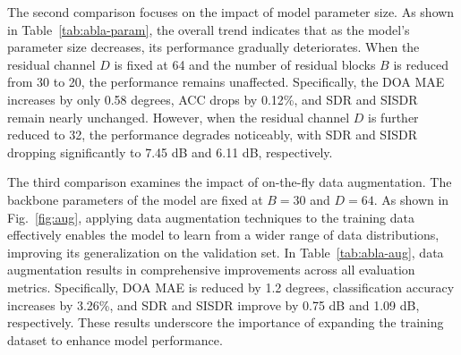 \documentclass{IEEEtran}
\begin{document}
The second comparison focuses on the impact of model parameter size. As shown in Table~\ref{tab:abla-param}, the overall trend indicates that as the model's parameter size decreases, its performance gradually deteriorates. When the residual channel $D$ is fixed at 64 and the number of residual blocks $B$ is reduced from 30 to 20, the performance remains unaffected. Specifically, the DOA MAE increases by only 0.58 degrees, ACC drops by 0.12\%, and SDR and SISDR remain nearly unchanged. However, when the residual channel $D$ is further reduced to 32, the performance degrades noticeably, with SDR and SISDR dropping significantly to 7.45 dB and 6.11 dB, respectively.

The third comparison examines the impact of on-the-fly data augmentation. The backbone parameters of the model are fixed at $B=30$ and $D=64$. As shown in Fig.~\ref{fig:aug}, applying data augmentation techniques to the training data effectively enables the model to learn from a wider range of data distributions, improving its generalization on the validation set. In Table~\ref{tab:abla-aug}, data augmentation results in comprehensive improvements across all evaluation metrics. Specifically, DOA MAE is reduced by 1.2 degrees, classification accuracy increases by 3.26\%, and SDR and SISDR improve by 0.75 dB and 1.09 dB, respectively. These results underscore the importance of expanding the training dataset to enhance model performance.
\end{document}
